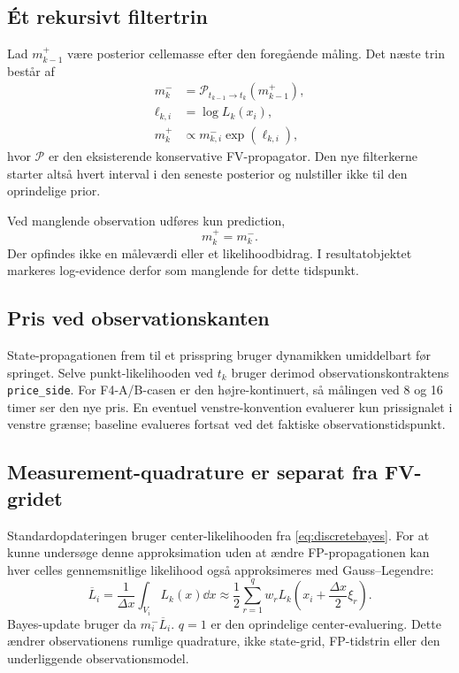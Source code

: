 \subsection{Ét rekursivt filtertrin}
Lad \(m_{k-1}^+\) være posterior cellemasse efter den foregående måling.
Det næste trin består af
\begin{align}
 m_k^- &= \mathcal P_{t_{k-1}\to t_k}(m_{k-1}^+),\\
 \ell_{k,i} &= \log L_k(x_i),\\
 m_k^+ &\propto m_{k,i}^-\exp(\ell_{k,i}),
\end{align}
hvor \(\mathcal P\) er den eksisterende konservative FV-propagator. Den nye
filterkerne starter altså hvert interval i den seneste posterior og nulstiller
ikke til den oprindelige prior.

Ved manglende observation udføres kun prediction,
\begin{equation}
 m_k^+=m_k^-.
\end{equation}
Der opfindes ikke en måleværdi eller et likelihoodbidrag. I resultatobjektet
markeres log-evidence derfor som manglende for dette tidspunkt.

\subsection{Pris ved observationskanten}
State-propagationen frem til et prisspring bruger dynamikken umiddelbart før
springet. Selve punkt-likelihooden ved \(t_k\) bruger derimod observationskontraktens
\texttt{price\_side}. For F4-A/B-casen er den højre-kontinuert, så målingen ved
8 og 16 timer ser den nye pris. En eventuel venstre-konvention evaluerer kun
prissignalet i venstre grænse; baseline evalueres fortsat ved det faktiske
observationstidspunkt.

\subsection{Measurement-quadrature er separat fra FV-gridet}
Standardopdateringen bruger center-likelihooden fra \eqref{eq:discretebayes}.
For at kunne undersøge denne approksimation uden at ændre FP-propagationen kan
hver celles gennemsnitlige likelihood også approksimeres med Gauss--Legendre:
\begin{equation}
 \overline L_i=\frac1{\Delta x}\int_{V_i}L_k(x)\dd x
 \approx \frac12\sum_{r=1}^{q}w_rL_k\!\left(x_i+\frac{\Delta x}{2}\xi_r\right).
\end{equation}
Bayes-update bruger da \(m_i^-\overline L_i\). \(q=1\) er den oprindelige
center-evaluering. Dette ændrer observationens rumlige quadrature, ikke state-grid,
FP-tidstrin eller den underliggende observationsmodel.

